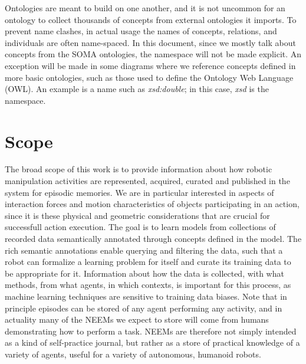 Ontologies are meant to build on one another, and it is not uncommon for an ontology to collect thousands of concepts from external ontologies it imports.
To prevent name clashes, in actual usage the names of concepts, relations, and individuals are often name-spaced.
In this document, since we mostly talk about concepts from the SOMA ontologies,
the namespace will not be made explicit.
An exception will be made in some diagrams where we reference concepts defined in more basic ontologies,
such as those used to define the Ontology Web Language (OWL).
An example is a name such as \emph{xsd:double}; in this case, \emph{xsd} is the namespace.

\section{Scope} %
\label{sec:scope}

The broad scope of this work is to provide information about how robotic manipulation activities are represented, acquired, curated and published in the \ease system for episodic memories.
We are in particular interested in
aspects of interaction forces and motion characteristics of objects participating in an action, since it is these physical and geometric considerations that are crucial for successfull action execution.
The goal is to learn models from collections of recorded data semantically annotated through concepts defined in the \neem model.
The rich semantic annotations enable querying and filtering the data, such that a robot can formalize a learning problem for itself and curate its training data to be appropriate for it.
Information about how the data is collected, with what methods, from what agents, in which contexts, is important for this process, as machine learning techniques are sensitive to training data biases.
Note that in principle episodes can be stored of any agent performing any activity, and in actuality many of the NEEMs we expect to store will come from humans demonstrating how to perform a task.
NEEMs are therefore not simply intended as a kind of self-practice journal, but rather as a store of practical knowledge of a variety of agents, useful for a variety of autonomous, humanoid robots.

